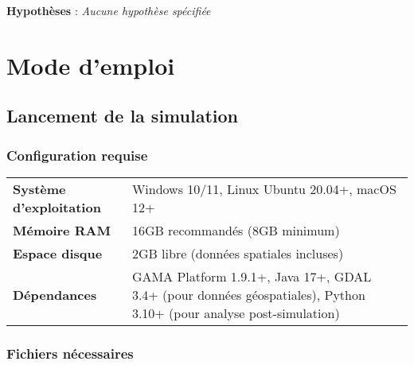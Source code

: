 \documentclass[
]{article}
\begin{document}
\textbf{Hypothèses} : \emph{Aucune hypothèse spécifiée}

\section{Mode d'emploi}\label{mode-demploi}

\subsection{Lancement de la
simulation}\label{lancement-de-la-simulation}

\subsubsection{Configuration requise}\label{configuration-requise}

\begin{longtable}[]{@{}
  >{\raggedright\arraybackslash}p{}
  >{\raggedright\arraybackslash}p{}@{}}
\toprule\noalign{}
\endhead
\bottomrule\noalign{}
\endlastfoot
\textbf{Système d'exploitation} & Windows 10/11, Linux Ubuntu 20.04+,
macOS 12+ \\
\textbf{Mémoire RAM} & 16GB recommandés (8GB minimum) \\
\textbf{Espace disque} & 2GB libre (données spatiales incluses) \\
\textbf{Dépendances} & GAMA Platform 1.9.1+, Java 17+, GDAL 3.4+ (pour
données géospatiales), Python 3.10+ (pour analyse post-simulation) \\
\end{longtable}

\subsubsection{Fichiers nécessaires}\label{fichiers-nuxe9cessaires}
\end{document}
